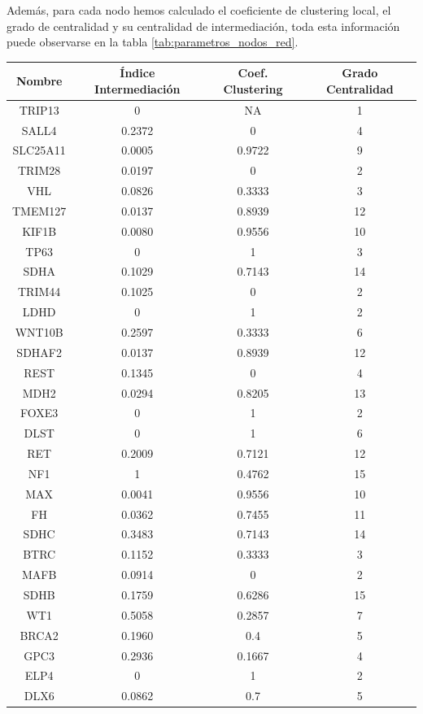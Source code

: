 Además, para cada nodo hemos calculado el coeficiente de clustering local, el grado de centralidad y su centralidad de intermediación, toda esta información puede observarse en la tabla \ref{tab:parametros_nodos_red}. 
\begin{table}[ht]
	\centering
	\begin{tabular}{|c|c|c|c|}
		\hline
		\textbf{Nombre} & \textbf{Índice Intermediación} & \textbf{Coef. Clustering} & \textbf{Grado Centralidad}\\ \hline
		TRIP13 & 0 & NA & 1 \\
		SALL4 & 0.2372 & 0 & 4 \\
		SLC25A11 & 0.0005 & 0.9722 & 9 \\
		TRIM28 & 0.0197 & 0 & 2 \\
		VHL & 0.0826 & 0.3333 & 3 \\
		TMEM127 & 0.0137 & 0.8939 & 12 \\
		KIF1B & 0.0080 & 0.9556 & 10 \\
		TP63 & 0 & 1 & 3 \\
		SDHA & 0.1029 & 0.7143 & 14 \\
		TRIM44 & 0.1025 & 0 & 2 \\
		LDHD & 0 & 1 & 2 \\
		WNT10B & 0.2597 & 0.3333 & 6 \\
		SDHAF2 & 0.0137 & 0.8939 & 12 \\
		REST & 0.1345 & 0 & 4 \\
		MDH2 & 0.0294 & 0.8205 & 13 \\
		FOXE3 & 0 & 1 & 2 \\
		DLST & 0 & 1 & 6 \\
		RET & 0.2009 & 0.7121 & 12 \\
		NF1 & 1 & 0.4762 & 15 \\
		MAX & 0.0041 & 0.9556 & 10 \\
		FH & 0.0362 & 0.7455 & 11 \\
		SDHC & 0.3483 & 0.7143 & 14 \\
		BTRC & 0.1152 & 0.3333 & 3 \\
		MAFB & 0.0914 & 0 & 2 \\
		SDHB & 0.1759 & 0.6286 & 15 \\
		WT1 & 0.5058 & 0.2857 & 7 \\
		BRCA2 & 0.1960 & 0.4 & 5 \\
		GPC3 & 0.2936 & 0.1667 & 4 \\
		ELP4 & 0 & 1 & 2 \\
		DLX6 & 0.0862 & 0.7 & 5 \\

\end{tabular}
\end{table}
